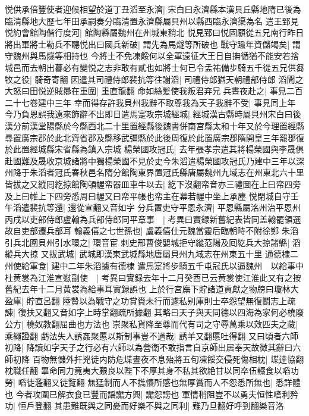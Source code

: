 悦供承倍豐使者迎候相望於道丁丑滔至永濟|{
	宋白曰永濟縣本漢貝丘縣地隋已後為臨清縣地大歷七年田承嗣奏分臨清置永濟縣屬貝州以縣西臨永濟渠為名}
遣王郅見悦約會館陶偕行度河|{
	館陶縣屬魏州在州城東稍北}
悦見郅曰悦固願從五兄南行昨日將出軍將士勒兵不聽悦出曰國兵新破|{
	謂先為馬燧等所破也}
戰守踰年資儲竭矣|{
	謂守魏州與馬燧等相持也}
今將士不免凍餒何以全軍遠征大王日自撫循猶不能安若捨城邑而去朝出暮必有變悦之志非敢有貳也如將士何已令孟祐備步騎五千從五兄供芻牧之役|{
	騎奇寄翻}
因遣其司禮侍郎裴抗等往謝滔|{
	司禮侍郎猶天朝禮部侍郎}
滔聞之大怒曰田悦逆賊曏在重圍|{
	重直龍翻}
命如絲髪使我叛君弃兄兵晝夜赴之|{
	事見二百二十七卷建中三年}
幸而得存許我貝州我辭不取尊我為天子我辭不受|{
	事見同上年}
今乃負恩誤我遠來飾辭不出即日遣馬寔攻宗城經城|{
	經城漢古縣時屬貝州宋白曰後漢分前漢堂陽縣於今縣西北二十里置經縣後魏書併南宫縣太和十年又於今理置經縣尋置廣宗郡於此北齊省郡及縣移武彊縣於此後周復於此置廣宗郡隋開皇三年罷郡復於此置經城縣宋省縣為鎮入宗城}
楊榮國攻冠氏|{
	去年張孝宗遣其將楊榮國與李晟俱赴國難及晟收京城諸將中獨楊榮國不見於史今朱滔遣楊榮國攻冠氏乃建中三年以深州降于朱滔者冠氏春秋邑名隋分館陶東界置冠氏縣唐屬魏州九域志在州東北六十里}
皆拔之又縱囘紇掠館陶頓幄帟器皿車牛以去|{
	紇下沒翻帟音亦三禮圖在上曰帟四旁及上曰帷上下四旁悉周曰幄又曰帟平帳也帟主在幕若幄中坐上承塵}
悦閉城自守壬午滔遣裴抗等還|{
	還從宣翻又音如字}
分兵置吏守平恩永濟|{
	平恩縣屬洺州治平恩州}
丙戌以吏部侍郎盧翰為兵部侍郎同平章事　|{
	考異曰實録新舊紀表皆同盖翰罷領選故自吏部遷兵部耳}
翰義僖之七世孫也|{
	盧義僖仕元魏當靈后臨朝時不附徐鄭}
朱滔引兵北圍貝州引水環之|{
	環音宦}
刺史邢曹俊嬰城拒守縱范陽及囘紇兵大掠諸縣|{
	滔縱兵大掠}
又拔武城|{
	武城即漢東武城縣地唐屬貝州九域志在州東五十里}
通德棣二州使給軍食|{
	建中二年朱滔據有德棣}
遣馬寔將步騎五千屯冠氏以逼魏州　以給事中杜黄裳為江淮宣慰副使　|{
	考異曰實録去年十二月癸酉已云黄裳使江淮此又有之按舊紀去年十二月黄裳為給事耳實録誤也}
上於行宫廡下貯諸道貢獻之物牓曰瓊林大盈庫|{
	貯直呂翻}
陸䞇以為戰守之功賞賚未行而遽私别庫則士卒怨望無復鬭志上疏諫|{
	復扶又翻又音如字上時掌翻疏所據翻}
其略曰天子與天同德以四海為家何必橈廢公方|{
	橈奴教翻屈曲也方法也}
崇聚私貨降至尊而代有司之守辱萬乘以效匹夫之藏|{
	乘繩證翻}
虧法失人誘姦聚慝以斯制事豈不過哉|{
	誘羊又翻慝吐得翻}
又曰頃者六師初降|{
	降讀如字天子之行必有六師以為營衛不敢指言自京師出居奉天故微其辭曰六師初降}
百物無儲外扞兇徒内防危堞晝夜不息殆將五旬凍餒交侵死傷相枕|{
	堞逹協翻枕職任翻}
畢命同力竟夷大艱良以陛下不厚其身不私其欲絶甘以同卒伍輟食以㗖功勞|{
	㗖徒濫翻又徒覽翻}
無猛制而人不擕懷所感也無厚賞而人不怨悉所無也|{
	悉詳體也}
今者攻圍已解衣食已豐而謡讟方興|{
	讟怨謗也}
軍情稍阻豈不以勇夫恒性嗜利矜功|{
	恒戶登翻}
其患難既與之同憂而好樂不與之同利|{
	難乃旦翻好呼到翻樂音洛}
